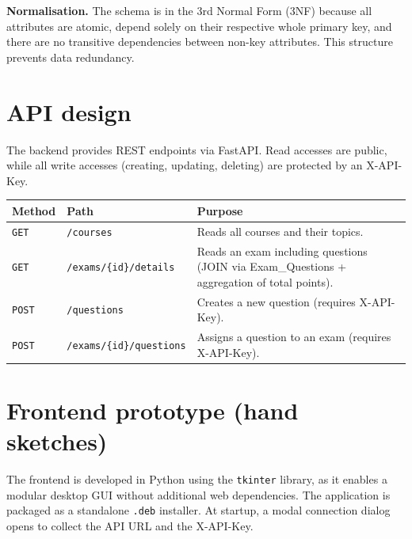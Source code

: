 \documentclass[11pt,a4paper]{article}
\begin{document}
\textbf{Normalisation.} The schema is in the 3rd Normal Form (3NF) because all attributes are atomic, depend solely on their respective whole primary key, and there are no transitive dependencies between non-key attributes. This structure prevents data redundancy.

\section{API design}

The backend provides REST endpoints via FastAPI. Read accesses are public, while all write accesses (creating, updating, deleting) are protected by an X-API-Key.

\renewcommand{\arraystretch}{1.2}
\begin{tabularx}{\linewidth}{@{}p{2cm}p{4.5cm}X@{}}
\toprule
\textbf{Method} & \textbf{Path} & \textbf{Purpose} \\
\midrule
\texttt{GET}  & \texttt{/courses} & Reads all courses and their topics. \\
\texttt{GET}  & \texttt{/exams/\{id\}/details} & Reads an exam including questions (JOIN via Exam\_Questions + aggregation of total points). \\
\texttt{POST} & \texttt{/questions} & Creates a new question (requires X-API-Key). \\
\texttt{POST} & \texttt{/exams/\{id\}/questions} & Assigns a question to an exam (requires X-API-Key). \\
\bottomrule
\end{tabularx}

\section{Frontend prototype (hand sketches)}

The frontend is developed in Python using the \texttt{tkinter} library, as it enables a modular desktop GUI without additional web dependencies. The application is packaged as a standalone \texttt{.deb} installer. At startup, a modal connection dialog opens to collect the API URL and the X-API-Key.
\end{document}
